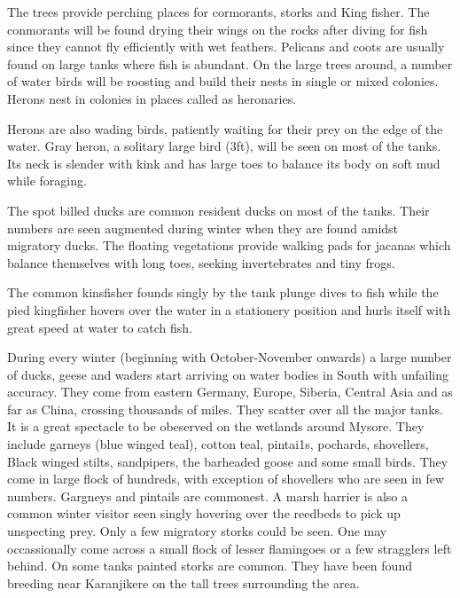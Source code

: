The trees provide perching places for cormorants, storks 
and King fisher. The conmorants will be found drying their 
wings on the rocks after diving for fish since they cannot 
fly efficiently with wet feathers. Pelicans and coots are 
usually found on large tanks where fish is abundant. On the 
large trees around, a number of water birds will be roosting 
and build their nests in single or mixed colonies. Herons 
nest in colonies in places called as heronaries. 

Herons are also wading birds, patiently waiting for 
their prey on the edge of the water. Gray heron, a 
solitary large bird (3ft), will be seen on most of the tanks. 
Its neck is slender with kink and has large toes to balance 
its body on soft mud while foraging. 

The spot billed ducks are common resident ducks on most 
of the tanks. Their numbers are seen augmented during winter 
when they are found amidst migratory ducks. The floating 
vegetations provide walking pads for jacanas which balance 
themselves with long toes, seeking invertebrates and tiny 
frogs. 

The common kinsfisher founds singly by the tank plunge 
dives to fish while the pied kingfisher hovers over the water 
in a stationery position and hurls itself with great speed at 
water to catch fish. 

\bigskip
\noindent
{} 
\smallskip

During every winter (beginning with October-November 
onwards) a large number of ducks, geese and waders start 
arriving on water bodies in South with unfailing accuracy. 
They come from eastern Germany, Europe, Siberia, Central Asia 
and as far as China, crossing thousands of miles. They 
scatter over all the major tanks. It is a great spectacle to 
be obeserved on the wetlands around Mysore. They include 
garneys (blue winged teal), cotton teal, pintai1s, 
pochards, shovellers, Black winged stilts, sandpipers, the 
barheaded goose and some small birds. They come in large 
flock of hundreds, with exception of shovellers who are seen 
in few numbers. Gargneys and pintails are commonest. A 
marsh harrier is also a common winter visitor seen singly 
hovering over the reedbeds to pick up unspecting prey. Only 
a few migratory storks could be seen. One may occassionally 
come across a small flock of lesser flamingoes  or a few 
stragglers left behind. On some tanks painted storks are 
common. They have been found breeding near Karanjikere on the tall 
trees surrounding the area. 

